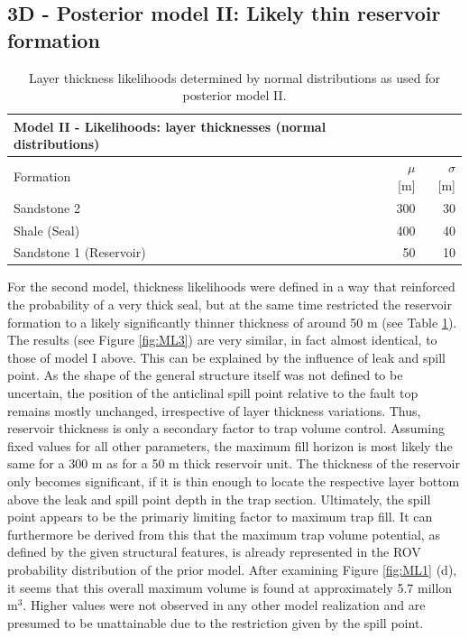 		\subsection{3D - Posterior model II: Likely thin reservoir formation}%
		\begin{table}[h]
			\centering
			\begin{tabular}{lrr} 
				\toprule
				Model II - Likelihoods: layer thicknesses (normal distributions)\\  
				\midrule 
				Formation & $\mu$ [m] & $\sigma$ [m]\\ 
				\midrule 
				Sandstone 2 & 300 & 30 \\
				Shale (Seal) & 400 & 40\\ 
				Sandstone 1 (Reservoir) & 50 & 10 \\
				\bottomrule
			\end{tabular}
			\caption{Layer thickness likelihoods determined by normal distributions as used for posterior model II.}
			\label{tab:ML3_likelihoods}
		\end{table}
		For the second model, thickness likelihoods were defined in a way that reinforced the probability of a very thick seal, but at the same time restricted the reservoir formation to a likely significantly thinner thickness of around 50 m (see Table \ref{tab:ML3_likelihoods}). The results (see Figure \ref{fig:ML3}) are very similar, in fact almost identical, to those of model I above. This can be explained by the influence of leak and spill point. As the shape of the general structure itself was not defined to be uncertain, the position of the anticlinal spill point relative to the fault top remains mostly unchanged, irrespective of layer thickness variations. Thus, reservoir thickness is only a secondary factor to trap volume control. Assuming fixed values for all other parameters, the maximum fill horizon is most likely the same for a 300 m as for a 50 m thick reservoir unit. The thickness of the reservoir only becomes significant, if it is thin enough to locate the respective layer bottom above the leak and spill point depth in the trap section. Ultimately, the spill point appears to be the primariy limiting factor to maximum trap fill. It can furthermore be derived from this that the maximum trap volume potential, as defined by the given structural features, is already represented in the ROV probability distribution of the prior model. After examining Figure \ref{fig:ML1} (d), it seems that this overall maximum volume is found at approximately 5.7 millon m$^3$. Higher values were not observed in any other model realization and are presumed to be unattainable due to the restriction given by the spill point.
	
